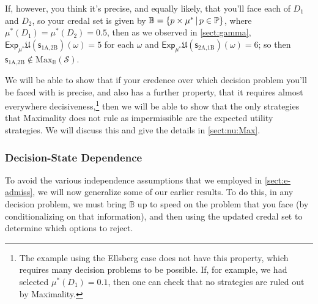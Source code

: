 \documentclass[a4paper]{article}
\newcommand\D{\mathcal{D}}
\newcommand\s{\mathsf{s}}
\renewcommand\P{\mathbb{P}} %
\newcommand\Exp{\mathsf{Exp}}
\newcommand\U{\mathfrak{U}} %
\newcommand\Maximality{\mathrm{Max}}
\newcommand{\IB}{\mathbb{B}}
\newcommand{\IP}{\P}
\renewcommand{\color}[1]{}
\newcommand{\Strategies}{\mathcal{S}}
\newcommand\SetDelimiter[1][]{
	\nonscript\,#1\vert \allowbreak \nonscript\,\mathopen{}}
\providecommand\given{\SetDelimiter}
\newenvironment{CCM rewritten}
{\begingroup\color{blue}} %
{\endgroup}              %
\begin{document}
{If, however, you think it's precise, and equally likely, that you'll face each of $D_1$ and $D_2$, so your credal set is given by $\IB=\{p\times\mu^*\given p\in\IP\}$, where $\mu^*(D_1)=\mu^*(D_2)=0.5$, then as we observed in \cref{sect:gamma}, $\Exp_{\mu^*}\U(\s_{\text{1A,2B}})(\omega)=5$ for each $\omega$ and $\Exp_{\mu^*}\U(\s_{\text{2A,1B}})(\omega)=6$; so then $\s_{\text{1A,2B}}\notin\Maximality_\IB(\Strategies)$. 

We will be able to show that if your credence over which decision problem you'll be faced with is precise, and also has a further property, that it requires almost everywhere decisiveness,\footnote{The example using the Ellsberg case does not have this property, which requires many decision problems to be possible. If, for example, we had selected $\mu^*(D_1)=0.1$, then one can check that no strategies are ruled out by Maximality.} then we will be able to show that the only strategies that Maximality does not rule as impermissible are the expected utility strategies. We will discuss this and give the details in \cref{sect:nu:Max}.




	\subsubsection{Decision-State Dependence}\label{sect:EAd-dep}
{\color{red} To avoid the various independence assumptions that we employed in \cref{sect:e-admiss}, we will now generalize some of our earlier results. To do this, in any decision problem, we must bring $\IB$ up to speed on the problem that you face (by conditionalizing on that information), and then using the updated credal set to determine which options to reject.}


}
\end{document}
